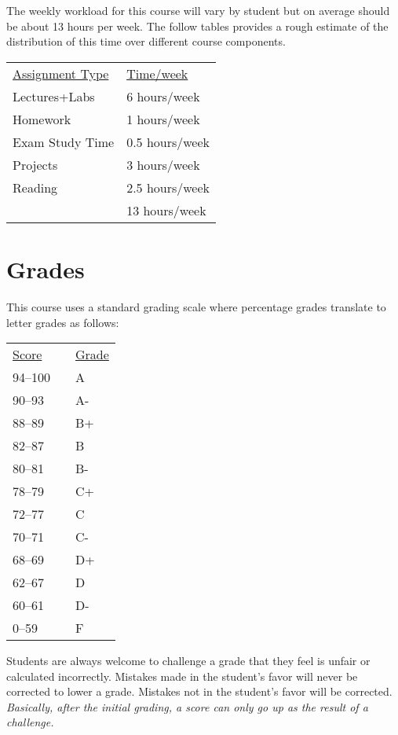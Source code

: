 \documentclass[10pt]{article}
\begin{document}
The weekly workload for this course will vary by student but on average should be about 13 hours per week.  The follow tables provides a rough estimate of the distribution of this time over different course components.
\begin{center}
\begin{tabular}{ll}
\underline{Assignment Type} & \underline{Time/week} \\
Lectures+Labs       & 6 hours/week \\
Homework          & 1 hours/week \\
Exam Study Time    & 0.5 hours/week \\
Projects          & 3 hours/week \\
Reading &  2.5 hours/week \\
\bottomrule
 & 13 hours/week
\end{tabular}
\end{center}

\section{Grades}

This course uses a standard grading scale where percentage grades translate to letter grades as follows:

\begin{center}
\begin{small}
\begin{tabular}{lcl}
\underline{Score} & & \underline{Grade} \\
94--100 & & A \\
90--93 & & A- \\
88--89 & & B+ \\
82--87 & & B \\
80--81 & & B- \\
78--79 & & C+ \\
72--77 & & C \\
70--71 & & C- \\
68--69 & & D+ \\
62--67 & & D \\
60--61 & & D- \\
0--59 & & F
\end{tabular}
\end{small}
\end{center}


Students are always welcome to challenge a grade that they feel is unfair or calculated incorrectly.  Mistakes made in the student's favor will never be corrected to lower a grade.  Mistakes not in the student's favor will be corrected.  \textit{Basically, after the initial grading, a score can only go up as the result of a challenge.}
\end{document}
